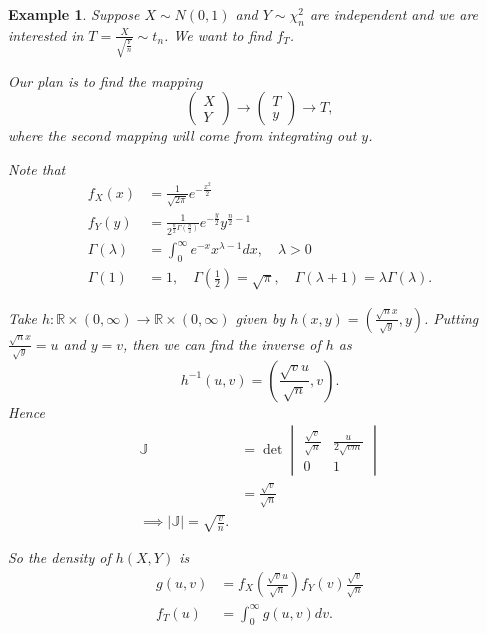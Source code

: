 \documentclass{tufte-handout}
\newcommand*\R{\mathbb{R}}
\newtheorem{ex}[thm]{Example}
\theoremstyle{definition}
\begin{document}
\begin{ex}
	Suppose $X \sim N(0,1)$ and $Y \sim \chi^2_n$ are independent and we are interested in $T = \frac{X}{\sqrt{\frac{Y}{n}}} \sim t_n$. We want to find $f_T$.

	Our plan is to find the mapping \[
		\begin{pmatrix}
		X  \\
		Y
		\end{pmatrix} \to \begin{pmatrix}
		T  \\
		y
		\end{pmatrix} \to T
	,\] where the second mapping will come from integrating out $y$.

	Note that 
	\begin{align*}
		f_X(x) &= \frac{1}{\sqrt{2\pi} }e^{-\frac{x^2}{2}} \\
		f_Y(y) &= \frac{1}{2^{\frac{n}{2} \Gamma\left( \frac{n}{2} \right)}}e^{-\frac{y}{2}}y^{\frac{n}{2}-1} \\
		\Gamma(\lambda) &= \int_{0}^{\infty} e^{-x}x^{\lambda - 1}dx, \quad \lambda > 0 \\
		\Gamma(1) &= 1, \quad \Gamma(\frac{1}{2}) = \sqrt{\pi}, \quad \Gamma(\lambda + 1) = \lambda \Gamma(\lambda)
	.\end{align*}

	Take $h: \R \times (0,\infty) \to \R \times (0,\infty)$ given by $h(x,y) = \left( \frac{\sqrt{n} x}{\sqrt{y} }, y \right)$.
	Putting $\frac{\sqrt{n} x}{\sqrt{y} } = u$ and $y = v$, then we can find the inverse of $h$ as \[
		h^{-1}(u,v) = (\frac{\sqrt{v} u}{\sqrt{n} }, v)
	.\] 
	Hence 
	\begin{align*}
		\mathbb{J} &= \det \begin{vmatrix}
		\frac{\sqrt{v} }{\sqrt{n} } & \frac{u}{2\sqrt{vm} } \\
		0 & 1
		\end{vmatrix}  \\
				   &= \frac{\sqrt{v} }{\sqrt{n} } \\
				   \implies \left| \mathbb{J} \right| = \sqrt{\frac{v}{n}} 
	.\end{align*}

	So the density of $h(X,Y)$ is
	\begin{align*}
		g(u,v) &= f_X(\frac{\sqrt{v} u}{\sqrt{n} })f_Y(v) \frac{\sqrt{v} }{\sqrt{n} } \\
		f_T(u) &= \int_{0}^{\infty} g(u,v) dv 
	.\end{align*}
	
\end{ex}
\end{document}
